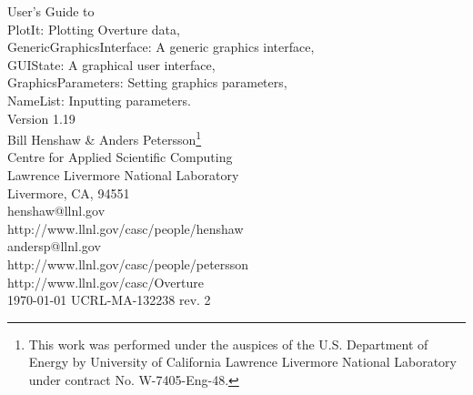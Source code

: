 \documentclass{article}
\begin{document}
\def\R      {{\bf R}}
\def\Dv     {{\bf D}}
\def\bv     {{\bf b}}
\def\fv     {{\bf f}}
\def\Fv     {{\bf F}}
\def\gv     {{\bf g}}
\def\iv     {{\bf i}}
\def\jv     {{\bf j}}
\def\kv     {{\bf k}}
\def\nv     {{\bf n}}
\def\rv     {{\bf r}}
\def\tv     {{\bf t}}
\def\uv     {{\bf u}}
\def\Uv     {{\bf U}}
\def\vv     {{\bf v}}
\def\Vv     {{\bf V}}
\def\xv     {{\bf x}}
\def\yv     {{\bf y}}
\def\zv     {{\bf z}}
\def\lt     {{<}}
\def\grad    {\nabla}
\def\comma  {~~~,~~}
\def\uvd    {{\bf U}}
\def\ud     {{    U}}
\def\pd     {{    P}}
\def\calo{{\cal O}}

\def\ff {\tt} %
\def\neq {{\ff neq }}
\def\nze {{\ff nze }}
\def\nsave {{\ff nsave}}
\def\nfill {{\ff nfill }}
\def\nqs {${\ff nze}^*$}
\def\flags {{\ff flags }}
\def\icf {{\ff icf}}
\def\idebug {{\ff idebug}}
\def\zratio {{\ff zratio }}
\def\fratio {{\ff fratio }}
\def\icg {{\ff icg }}
\def\ipc {{\ff ipc }}
\def\ipcf {{\ff ipcf }}
\def\rpcf {{\ff rpcf }}
\def\icf {{\ff icf }}
\def\nd {{\ff nd }}
\def\nv {{\ff nv }}
\def\ng {{\ff ng }}
\def\bc {{\ff bc}}

\vspace{\baselineskip}
\begin{flushleft}
{\Large
User's Guide to\\
PlotIt: Plotting Overture data,\\
GenericGraphicsInterface: A generic graphics interface, \\
GUIState: A graphical user interface, \\
GraphicsParameters: Setting graphics parameters,\\
NameList: Inputting parameters.\\
\vspace{1cm}
Version 1.19 \\
}
\vspace{2\baselineskip}
Bill Henshaw \& Anders Petersson\footnote{
This work was performed under the auspices of the U.S. Department of
Energy by University of California Lawrence Livermore National
Laboratory under contract No. W-7405-Eng-48.
}\\
\vspace{\baselineskip}
Centre for Applied Scientific Computing \\
Lawrence Livermore National Laboratory    \\
Livermore, CA, 94551   \\
\vspace{\baselineskip}
henshaw@llnl.gov\\
http://www.llnl.gov/casc/people/henshaw \\
\vspace{\baselineskip}
andersp@llnl.gov\\
http://www.llnl.gov/casc/people/petersson \\
\vspace{\baselineskip}
http://www.llnl.gov/casc/Overture \\
\vspace{\baselineskip}
\today
\vspace{\baselineskip}
UCRL-MA-132238 rev. 2
\end{flushleft}
\end{document}
